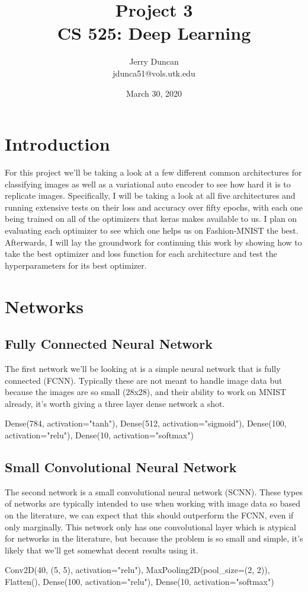 \documentclass[12pt]{article}
\title{Project 3 \\\vspace{1em}
\large CS 525: Deep Learning}
\author{
  Jerry Duncan \\
  jdunca51@vols.utk.edu
}
\date{March 30, 2020}
\begin{document}
\maketitle
\pagebreak

\section{Introduction}

For this project we'll be taking a look at a few different common architectures for
 classifying images as well as a variational auto encoder to see how hard it is to replicate
 images.
Specifically, I will be taking a look at all five architectures and running extensive tests on their
 loss and accuracy over fifty epochs, with each one being trained on all of the optimizers that
 keras makes available to us.
I plan on evaluating each optimizer to see which one helps us on Fashion-MNIST the best.
Afterwards, I will lay the groundwork for continuing this work by showing how to take the best
 optimizer and loss function for each architecture and test the hyperparameters for its best optimizer.


\section{Networks}

\subsection{Fully Connected Neural Network}

The first network we'll be looking at is a simple neural network that is fully connected (FCNN).
Typically these are not meant to handle image data but because the images are so small (28x28),
 and their ability to work on MNIST already, it's worth giving a three layer dense network a shot.
\begin{python}
  Dense(784, activation="tanh"),
  Dense(512, activation="sigmoid"),
  Dense(100, activation="relu"),
  Dense(10, activation="softmax")
\end{python}


\subsection{Small Convolutional Neural Network}

The second network is a small convolutional neural network (SCNN).
These types of networks are typically intended to use when working with image data so based on the literature,
 we can expect that this should outperform the FCNN, even if only marginally.
This network only has one convolutional layer which is atypical for networks in the literature,
 but because the problem is so small and simple, it's likely that we'll get somewhat decent results using it.
\begin{python}
Conv2D(40, (5, 5), activation="relu"),
MaxPooling2D(pool_size=(2, 2)),
Flatten(),
Dense(100, activation="relu"),
Dense(10, activation="softmax")
\end{python}
\end{document}
